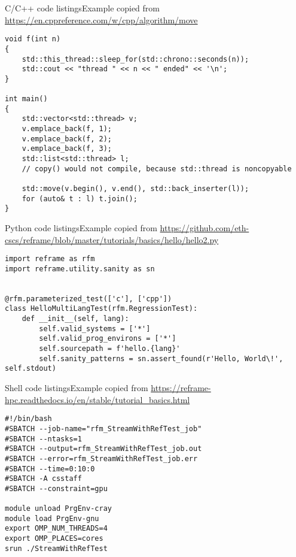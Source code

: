 \documentclass[aspectratio=169,12pt]{beamer}
\begin{document}
\begin{frame}[fragile]{C/C++ code listings}{Example copied from \url{https://en.cppreference.com/w/cpp/algorithm/move}}
  \begin{lstlisting}[style=cxxstyle]
void f(int n)
{
    std::this_thread::sleep_for(std::chrono::seconds(n));
    std::cout << "thread " << n << " ended" << '\n';
}

int main()
{
    std::vector<std::thread> v;
    v.emplace_back(f, 1);
    v.emplace_back(f, 2);
    v.emplace_back(f, 3);
    std::list<std::thread> l;
    // copy() would not compile, because std::thread is noncopyable

    std::move(v.begin(), v.end(), std::back_inserter(l));
    for (auto& t : l) t.join();
}
  \end{lstlisting}
\end{frame}

\begin{frame}[fragile]{Python code listings}{Example copied from \url{https://github.com/eth-cscs/reframe/blob/master/tutorials/basics/hello/hello2.py}}
  \begin{lstlisting}[style=pystyle]
import reframe as rfm
import reframe.utility.sanity as sn


@rfm.parameterized_test(['c'], ['cpp'])
class HelloMultiLangTest(rfm.RegressionTest):
    def __init__(self, lang):
        self.valid_systems = ['*']
        self.valid_prog_environs = ['*']
        self.sourcepath = f'hello.{lang}'
        self.sanity_patterns = sn.assert_found(r'Hello, World\!', self.stdout)
  \end{lstlisting}
\end{frame}

\begin{frame}[fragile]{Shell code listings}{Example copied from \url{https://reframe-hpc.readthedocs.io/en/stable/tutorial_basics.html}}
  \begin{lstlisting}[style=shstyle]
#!/bin/bash
#SBATCH --job-name="rfm_StreamWithRefTest_job"
#SBATCH --ntasks=1
#SBATCH --output=rfm_StreamWithRefTest_job.out
#SBATCH --error=rfm_StreamWithRefTest_job.err
#SBATCH --time=0:10:0
#SBATCH -A csstaff
#SBATCH --constraint=gpu

module unload PrgEnv-cray
module load PrgEnv-gnu
export OMP_NUM_THREADS=4
export OMP_PLACES=cores
srun ./StreamWithRefTest
  \end{lstlisting}
\end{frame}

\end{document}

